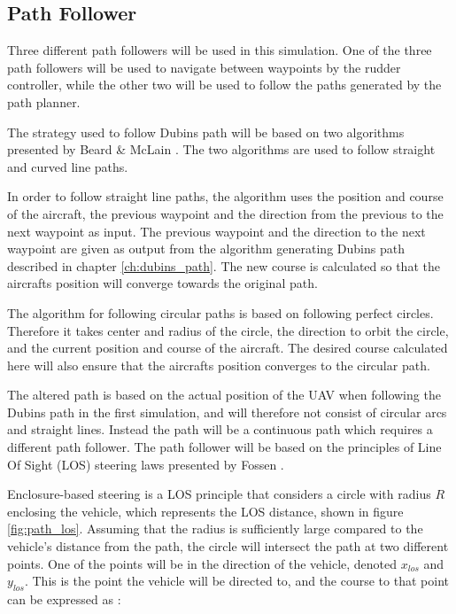 \subsection{Path Follower}
\label{ch:path_follower}

Three different path followers will be used in this simulation. One of the three path followers will be used to navigate between waypoints by the rudder controller, while the other two will be used to follow the paths generated by the path planner.

The strategy used to follow Dubins path will be based on two algorithms presented by Beard \& McLain \cite{suaBEARD}. The two algorithms are used to follow straight and curved line paths.

In order to follow straight line paths, the algorithm uses the position and course of the aircraft, the previous waypoint and the direction from the previous to the next waypoint as input. The previous waypoint and the direction to the next waypoint are given as output from the algorithm generating Dubins path described in chapter \ref{ch:dubins_path}. The new course is calculated so that the aircrafts position will converge towards the original path.

The algorithm for following circular paths is based on following perfect circles. Therefore it takes center and radius of the circle, the direction to orbit the circle, and the current position and course of the aircraft. The desired course calculated here will also ensure that the aircrafts position converges to the circular path.

The altered path is based on the actual position of the UAV when following the Dubins path in the first simulation, and will therefore not consist of circular arcs and straight lines. Instead the path will be a continuous path which requires a different path follower. The path follower will be based on the principles of Line Of Sight (LOS) steering laws presented by Fossen \cite{fartoyFOSSEN}.

Enclosure-based steering is a LOS principle that considers a circle with radius $R$ enclosing the vehicle, which represents the LOS distance, shown in figure \ref{fig:path_los}. Assuming that the radius is sufficiently large compared to the vehicle's distance from the path, the circle will intersect the path at two different points. One of the points will be in the direction of the vehicle, denoted $x_{los}$ and $y_{los}$. This is the point the vehicle will be directed to, and the course to that point can be expressed as \cite{fartoyFOSSEN}:

